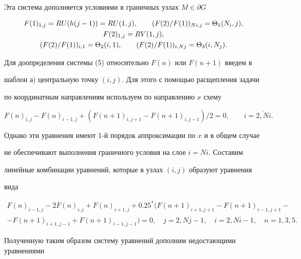 Эта система дополняется условиями в граничных узлах $M\in\partial G$ 


\begin{gather} 


F(1)_{1,j}=RU(h(j-1))=RU(1,j),\qquad (F(2)/F(1))_{Ni,j}=\Theta_1(N_i,j), 


\notag\\ 


F(2)_{1,j}=RV(1,j), \\ 


(F(2)/F(1))_{i,1}=\Theta_2(i,1),\qquad (F(2)/F(1))_{i,Nj}=\Theta_3(i,N_j). \notag


\end{gather} 


 


Для доопределения системы (5) относительно $F(n)$ или $F(n+1)$ введем в 


шаблон а) центральную точку $(i,j)$. Для этого с помощью расщепления задачи 


по координатным направлениям используем по направлению $x$ схему 


$$ 


F(n)_{i,j}-F(n)_{i-1,j}+(F(n+1)_{i,j+1}-F(n+1)_{i,j-1})/2=0,\qquad 


i=\overline{2,Ni}. 


$$ 


Однако эти уравнения имеют 1-й порядок аппроксимации по $x$ и в общем случае 


не обеспечивают выполнения граничного условия на слое $i=Ni$. Составим 


линейные комбинации уравнений, которые в узлах $(i,j)$ образуют уравнения 


вида 


\begin{multline} 


F(n)_{i-1,j}-2F(n)_{i,j}+F(n)_{i+1,j} 


+0.25^*(F(n+1)_{i+1,j+1}-F(n+1)_{i-1,j+1}-\\


-F(n+1)_{i+1,j-1} 


+F(n+1)_{i-1,j-1})=0,\quad j=\overline{2,Nj-1}, \quad 


i=\overline{2,Ni-1},\quad n=1,3,5. \tag{7а}


\end{multline} 


Полученную таким образом систему уравнений дополним недостающими уравнениями 


